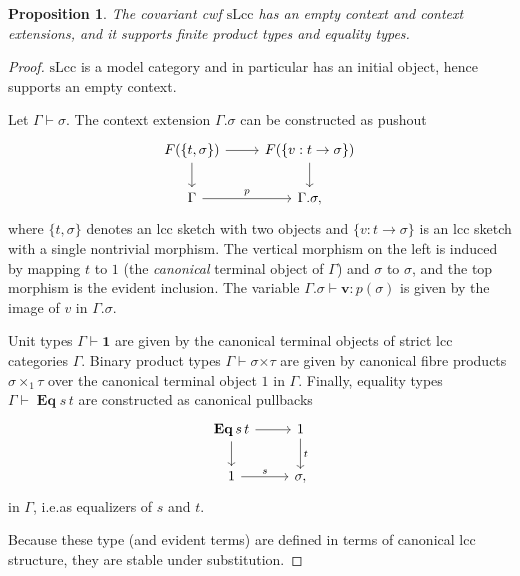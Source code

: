 \documentclass[a4paper]{article}
\newtheorem{proposition}[theorem]{Proposition}
\theoremstyle{remark}
\theoremstyle{definition}
\begin{document}
\begin{proposition}
  \label{prop:slcc-model}
  The covariant cwf $\mathrm{sLcc}$ has an empty context and context extensions, and it supports finite product types and equality types.
\end{proposition}
\begin{proof}
  $\mathrm{sLcc}$ is a model category and in particular has an initial object, hence supports an empty context.
  
  Let $\Gamma \vdash \sigma$.
  The context extension $\Gamma.\sigma$ can be constructed as pushout
  \begin{equation}
    \label{eq:slcc-context-extension}
    \begin{tikzcd}
      F(\{ t, \sigma \}) \arrow[d] \arrow[r] & F(\{ v : t \rightarrow \sigma \}) \arrow[d] \\
      \Gamma \arrow[r, "p"] & \Gamma.\sigma,
    \end{tikzcd}
  \end{equation}
  where $\{ t, \sigma \}$ denotes an lcc sketch with two objects and $\{ v : t \rightarrow \sigma \}$ is an lcc sketch with a single nontrivial morphism.
  The vertical morphism on the left is induced by mapping $t$ to $1$ (the \emph{canonical} terminal object of $\Gamma$) and $\sigma$ to $\sigma$, and the top morphism is the evident inclusion.
  The variable $\Gamma.\sigma \vdash \mathbf{v} : p(\sigma)$ is given by the image of $v$ in $\Gamma.\sigma$.

  Unit types $\Gamma \vdash \mathbf{1}$ are given by the canonical terminal objects of strict lcc categories $\Gamma$.
  Binary product types $\Gamma \vdash \sigma \mathbf{\times} \tau$ are given by canonical fibre products $\sigma \times_1 \tau$ over the canonical terminal object $1$ in $\Gamma$.
  Finally, equality types $\Gamma \vdash \operatorname{\mathbf{Eq}} s \, t$ are constructed as canonical pullbacks
  \begin{equation}
    \begin{tikzcd}
      \operatorname{\mathbf{Eq}} s \, t \arrow[r] \arrow[d] & 1 \arrow[d, "t"] \\
      1 \arrow[r, "s"] & \sigma,
    \end{tikzcd}
  \end{equation}
  in $\Gamma$, i.e.\@ as equalizers of $s$ and $t$.

  Because these type (and evident terms) are defined in terms of canonical lcc structure, they are stable under substitution.
\end{proof}
\end{document}
